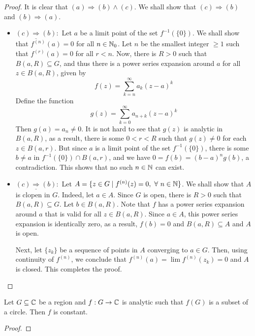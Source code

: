 \begin{proof}
It is clear that $(a)\Longrightarrow(b)\wedge(c)$. We shall show that $(c)\Longrightarrow(b)$ and $(b)\Longrightarrow(a)$.
\begin{itemize}
\item $\underline{(c)\Longrightarrow(b)}:$ Let $a$ be a limit point of the set $f^{-1}(\{0\})$. We shall show that $f^{(n)}(a) = 0$ for all $n\in\mathbb{N}_0$. Let $n$ be the smallest integer $\ge 1$ such that $f^{(r)}(a) = 0$ for all $r < n$. Now, there is $R > 0$ such that $B(a,R)\subseteq G$, and thus there is a power series expansion around $a$ for all $z\in B(a,R)$, given by 
\begin{equation*}
    f(z) = \sum_{k = n}^\infty a_k(z - a)^k
\end{equation*}
Define the function
\begin{equation*}
    g(z) = \sum_{k = 0}^\infty a_{n + k}(z - a)^k
\end{equation*}
Then $g(a) = a_n\ne 0$. It is not hard to see that $g(z)$ is analytic in $B(a,R)$, as a result, there is some $0 < r < R$ such that $g(z)\ne 0$ for each $z\in B(a,r)$. But since $a$ is a limit point of the set $f^{-1}(\{0\})$, there is some $b\ne a$ in $f^{-1}(\{0\})\cap B(a,r)$, and we have $0 = f(b) = (b - a)^ng(b)$, a contradiction. This shows that no such $n\in\mathbb{N}$ can exist.

\item $\underline{(c)\Longrightarrow(b)}:$ Let $A = \{z\in G\mid f^{(n)}(z) = 0,~\forall~n\in\mathbb{N}\}$. We shall show that $A$ is clopen in $G$. Indeed, let $a\in A$. Since $G$ is open, there is $R > 0$ such that $B(a,R)\subseteq G$. Let $b\in B(a,R)$. Note that $f$ has a power series expansion around $a$ that is valid for all $z\in B(a,R)$. Since $a\in A$, this power series expansion is identically zero, as a result, $f(b) = 0$ and $B(a,R)\subseteq A$ and $A$ is open.

Next, let $\{z_k\}$ be a sequence of points in $A$ converging to $a\in G$. Then, using continuity of $f^{(n)}$, we conclude that $f^{(n)}(a) = \lim f^{(n)}(z_k) = 0$ and $A$ is closed. This completes the proof.
\end{itemize}
\end{proof}

\begin{lemma}
    Let $G\subseteq\mathbb{C}$ be a region and $f: G\to\mathbb{C}$ is analytic such that $f(G)$ is a subset of a circle. Then $f$ is constant.
\end{lemma}
\begin{proof}
    
\end{proof}

